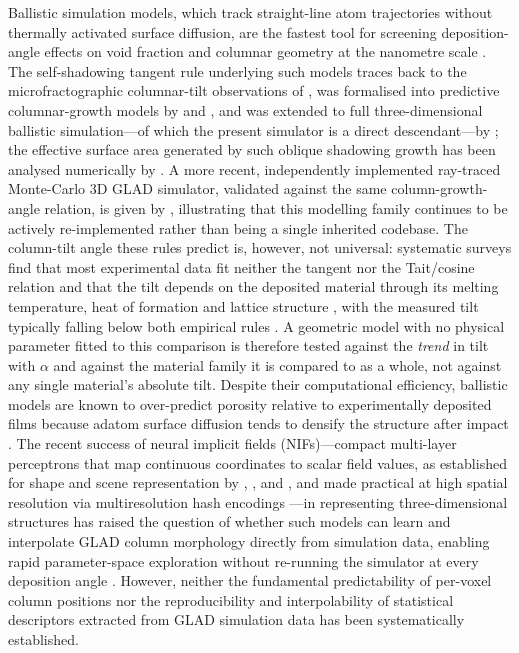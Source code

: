 \documentclass[aip,amsmath,amssymb,reprint]{revtex4-1}
\newcommand{\dang}{\ensuremath{\alpha}}
\begin{document}
Ballistic simulation models, which track straight-line atom trajectories
without thermally activated surface diffusion, are the fastest tool for
screening deposition-angle effects on void fraction and columnar geometry
at the nanometre scale \citep{karabacak2003}.
The self-shadowing tangent rule underlying such models traces back to the
microfractographic columnar-tilt observations of
\citet{nieuwenhuizen1966}, was formalised into predictive columnar-growth
models by \citet{tait1993modelling} and \citet{lichter1986model}, and was
extended to full three-dimensional ballistic simulation---of which the
present simulator is a direct descendant---by \citet{smy2000films};
the effective surface area generated by such oblique shadowing growth has
been analysed numerically by \citet{suzuki2001numerical}.
A more recent, independently implemented ray-traced Monte-Carlo 3D GLAD
simulator, validated against the same column-growth-angle relation, is
given by \citet{kulkarni2022glad3d}, illustrating that this modelling
family continues to be actively re-implemented rather than being a single
inherited codebase.
The column-tilt angle these rules predict is, however, not universal:
systematic surveys find that most experimental data fit neither the
tangent nor the Tait/cosine relation and that the tilt depends on the
deposited material through its melting temperature, heat of formation and
lattice structure \citep{zhu2012tilting,alvarez2014beyondtangent,barranco2016},
with the measured tilt typically falling below both empirical rules
\citep{alvarez2014beyondtangent}.  A geometric model with no physical
parameter fitted to this comparison is therefore tested against the
\emph{trend} in tilt with $\dang$ and against
the material family it is compared to as a whole, not against any single
material's absolute tilt.
Despite their computational efficiency, ballistic models are known to
over-predict porosity relative to experimentally deposited films because
adatom surface diffusion tends to densify the structure after impact
\citep{meakin1987,thornton1974}.
The recent success of neural implicit fields (NIFs)---compact multi-layer
perceptrons that map continuous coordinates to scalar field values, as
established for shape and scene representation by
\citet{sitzmann2020siren}, \citet{park2019deepsdf}, and
\citet{mescheder2019occupancy}, and made practical at high spatial
resolution via multiresolution hash encodings \citep{muller2022instant}---in
representing three-dimensional structures has raised the question of
whether such models can learn and interpolate GLAD column morphology
directly from simulation data, enabling rapid parameter-space
exploration without re-running the simulator at every deposition angle
\citep{tancik2020}.
However, neither the fundamental predictability of per-voxel column
positions nor the reproducibility and interpolability of statistical descriptors
extracted from GLAD simulation data has been systematically established.
\end{document}
